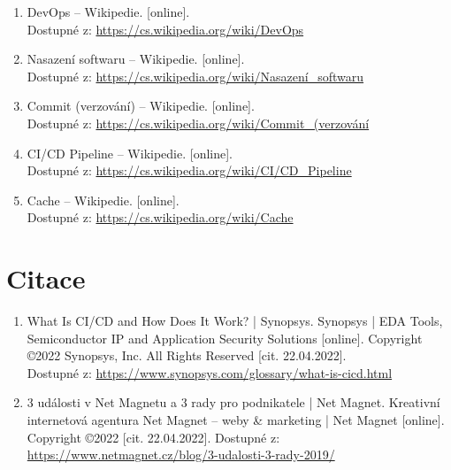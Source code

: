 \documentclass[12pt,a4paper]{report}
\begin{document}
\begin{enumerate}
    \item \noindent DevOps – Wikipedie. [online]. \\ Dostupné z: \url{https://cs.wikipedia.org/wiki/DevOps}
  
    \item \noindent Nasazení softwaru – Wikipedie. [online]. \\ Dostupné z: \url{https://cs.wikipedia.org/wiki/Nasazení\_softwaru}
  
    \item \noindent Commit (verzování) – Wikipedie. [online]. \\ Dostupné z: \url{https://cs.wikipedia.org/wiki/Commit\_(verzování}
  
    \item \noindent CI/CD Pipeline – Wikipedie. [online]. \\ Dostupné z: \url{https://cs.wikipedia.org/wiki/CI/CD\_Pipeline}
  
    \item \noindent Cache – Wikipedie. [online]. \\ Dostupné z: \url{https://cs.wikipedia.org/wiki/Cache}
\end{enumerate}
  
  
  \chapter{Citace}\small
  \begin{enumerate}
    
  \item What Is CI/CD and How Does It Work? | Synopsys. Synopsys | EDA Tools, Semiconductor IP and Application Security Solutions [online]. Copyright ©2022 Synopsys, Inc. All Rights Reserved [cit. 22.04.2022]. 
  \\Dostupné z: \url{https://www.synopsys.com/glossary/what-is-cicd.html }\\
  
  \item 3 události v Net Magnetu a 3 rady pro podnikatele | Net Magnet. Kreativní internetová agentura Net Magnet – weby \& marketing | Net Magnet [online]. Copyright ©2022 [cit. 22.04.2022]. Dostupné z: \url{https://www.netmagnet.cz/blog/3-udalosti-3-rady-2019/}
  
  \end{enumerate}
\end{document}
